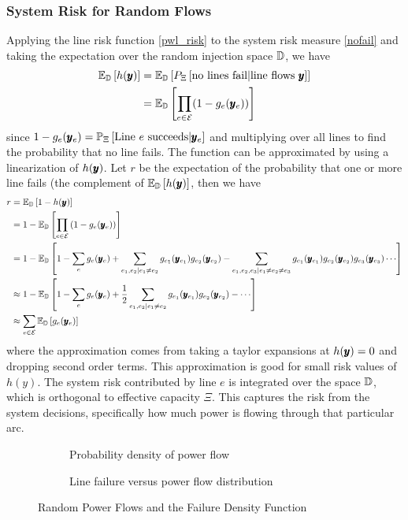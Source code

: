 \subsubsection*{System Risk for Random Flows}
Applying the line risk function \ref{pwl_risk} to the system risk measure \ref{nofail} and taking the expectation over the random injection space $\mathbb{D}$, we have
\begin{align*}
  \mathbb{E}_{\mathbb{D}} \left[ h(\pmb{y}) \right]  &= \mathbb{E}_{\mathbb{D}} \left[ P_\Xi \left[ \mbox{no lines fail} | \mbox{line flows } \pmb{y}\right] \right]\\
  &= \mathbb{E}_{\mathbb{D}} \left[  \prod_{e \in \mathcal{E}} (1 - g_e(\pmb{y}_e) ) \right]
\end{align*}
since $ 1- g_e(\pmb{y}_e) = \mathbb{P}_{\Xi} \left[ \text{Line }e\text{ succeeds} | \pmb{y}_e \right] $ and multiplying over all lines to find the probability that no line fails. The function can be approximated by using a linearization of $h(\pmb{y})$.  Let $r$ be the expectation of the probability that one or more line fails (the complement of $\mathbb{E}_{\mathbb{D}} \left[ h(\pmb{y}) \right]$, then we have
\begin{align*}\label{linear}
r &= \E{\bD}{1 - h(\ry)}  \\
 &= 1 - \E{\bD}{\prod_{e \in \cE}\left( 1 - g_e(\hry_e)\right) } \\
  &= 1 - \E{\bD}{ 1 - \sum_e g_e(\ry_e) + \sum_{e_1,e_2|e_1\neq e_2} g_{e_1} (\ry_{e_1}) g_{e_2}(\ry_{e_2}) - \sum_{e_1,e_2,e_3|e_1\neq e_2 \neq e_3} g_{e_1} (\ry_{e_1}) g_{e_2}(\ry_{e_2}) g_{e_3} (\ry_{e_3}) \cdots } \\
  & \approx 1 - \E{\bD}{ 1 - \sum_{e} g_e(\ry_e) + \frac{1}{2} \sum_{e_1,e_2|e_1\neq e_2} g_{e_1} (\ry_{e_1}) g_{e_2}(\ry_{e_2}) - \cdots } \\
 &\approx \sum_{e \in \cE} \E{\bD}{g_e(\hry_e)}
\end{align*}
where the approximation comes from taking a taylor expansions at $h(\pmb{y})=0$ and dropping second order terms.  This approximation is good for small risk values of $h(y)$.
The system risk contributed by line $e$ is integrated over the space $\mathbb{D}$, which is orthogonal to effective capacity $\Xi$.  This captures the risk from the system decisions, specifically how much power is flowing through that particular arc.  

\begin{figure}
 \centering                    
  \begin{subfigure}[b]{0.4\textwidth}
      
   \caption{Probability density of power flow}
  \end{subfigure}
  \begin{subfigure}[b]{.4\textwidth}
    
    \caption{Line failure versus power flow distribution}
  \end{subfigure}
  \caption{Random Power Flows and the Failure Density Function}
\end{figure}


